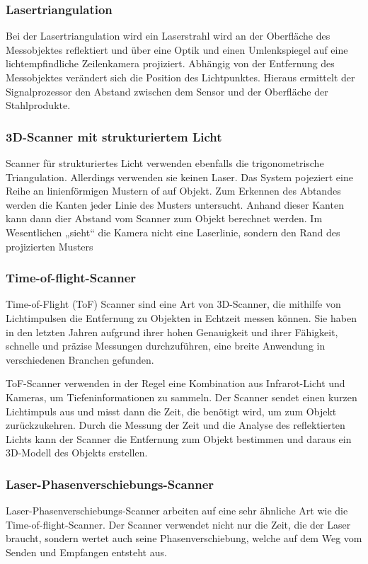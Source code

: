 \subsubsection{Lasertriangulation}
Bei der Lasertriangulation wird ein Laserstrahl wird an der Oberfläche des Messobjektes reflektiert und über eine Optik und einen Umlenkspiegel auf eine lichtempfindliche Zeilenkamera projiziert. Abhängig von der Entfernung des Messobjektes verändert sich die Position des Lichtpunktes. Hieraus ermittelt der Signalprozessor den Abstand zwischen dem Sensor und der Oberfläche der Stahlprodukte.

\subsubsection{3D-Scanner mit strukturiertem Licht}
Scanner für strukturiertes Licht verwenden ebenfalls die trigonometrische Triangulation. Allerdings verwenden sie keinen Laser. Das System pojeziert eine Reihe an linienförmigen Mustern of auf Objekt. Zum Erkennen des Abtandes werden die Kanten jeder Linie des Musters untersucht. Anhand dieser Kanten kann dann dier Abstand vom Scanner zum Objekt berechnet werden. Im Wesentlichen „sieht“ die Kamera nicht eine Laserlinie, sondern den Rand des projizierten Musters

\subsubsection{Time-of-flight-Scanner}
Time-of-Flight (ToF) Scanner sind eine Art von 3D-Scanner, die mithilfe von Lichtimpulsen die Entfernung zu Objekten in Echtzeit messen können. Sie haben in den letzten Jahren aufgrund ihrer hohen Genauigkeit und ihrer Fähigkeit, schnelle und präzise Messungen durchzuführen, eine breite Anwendung in verschiedenen Branchen gefunden.

ToF-Scanner verwenden in der Regel eine Kombination aus Infrarot-Licht und Kameras, um Tiefeninformationen zu sammeln. Der Scanner sendet einen kurzen Lichtimpuls aus und misst dann die Zeit, die benötigt wird, um zum Objekt zurückzukehren. Durch die Messung der Zeit und die Analyse des reflektierten Lichts kann der Scanner die Entfernung zum Objekt bestimmen und daraus ein 3D-Modell des Objekts erstellen.

\subsubsection{Laser-Phasenverschiebungs-Scanner}
Laser-Phasenverschiebungs-Scanner arbeiten auf eine sehr ähnliche Art wie die Time-of-flight-Scanner. Der Scanner verwendet nicht nur die Zeit, die der Laser braucht, sondern wertet auch seine Phasenverschiebung, welche auf dem Weg vom Senden und Empfangen entsteht aus.

